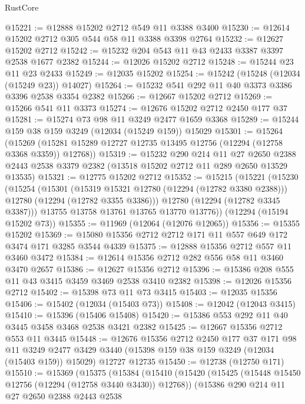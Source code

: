 \begin{lexlean}{RustCore}
\begin{coremodule}
@15221 := @12888 @15202 @2712 @549 @11 @3388 @3400
@15230 := @12614 @15202 @2712 @305 @544 @58 @11 @3388 @3398 @2764
@15232 := @12627 @15202 @2712
@15242 := @15232 @204 @543 @11 @43 @2433 @3387 @3397 @2538 @1677 @2382
@15244 := @12026 @15202 @2712
@15248 := @15244 @23 @11 @23 @2433
@15249 := @12035 @15202
@15254 := @15242 (@15248 (@12034 (@15249 @23)) @14027)
@15264 := @15232 @541 @292 @11 @40 @3373 @3386 @3396 @2538 @3354 @2382
@15266 := @12667 @15202 @2712
@15269 := @15266 @541 @11 @3373
@15274 := @12676 @15202 @2712 @2450 @177 @37
@15281 := @15274 @73 @98 @11 @3249 @2477 @1659 @3368
@15289 := @15244 @159 @38 @159 @3249 (@12034 (@15249 @159)) @15029
@15301 := @15264
    (@15269 (@15281 @15289 @12727 @12735 @13495 @12756 (@12294 (@12758 @3368 @3359)) @12768))
@15319 := @15232
    @290
    @214
    @11
    @27
    @2650
    @2388
    @2443
    @2538
    @3379
    @2382
    (@13518 @15202 @2712 @11 @289 @2650 @13529 @13535)
@15321 := @12775 @15202 @2712
@15352 := @15215
    (@15221
      (@15230
        (@15254
          (@15301
            (@15319 @15321 @12780 (@12294 (@12782 @3380 @2388)))
            @12780
            (@12294 (@12782 @3355 @3386)))
          @12780
          (@12294 (@12782 @3345 @3387)))
        @13755
        @13758
        @13761
        @13765
        @13770
        @13776))
    (@12294 (@15194 @15202 @73))
@15355 := @11969 (@12064 (@12076 @12065))
@15356 := @15355 @15202
@15369 := @15080 @15356 @2712 @2712 @171 @11 @557 @649 @172 @3474 @171 @3285 @3544 @4339
@15375 := @12888 @15356 @2712 @557 @11 @3460 @3472
@15384 := @12614 @15356 @2712 @282 @556 @58 @11 @3460 @3470 @2657
@15386 := @12627 @15356 @2712
@15396 := @15386 @208 @555 @11 @43 @3415 @3459 @3469 @2538 @3410 @2382
@15398 := @12026 @15356 @2712
@15402 := @15398 @73 @11 @73 @3415
@15403 := @12035 @15356
@15406 := @15402 (@12034 (@15403 @73))
@15408 := @12042 (@12043 @3415)
@15410 := @15396 (@15406 @15408)
@15420 := @15386 @553 @292 @11 @40 @3445 @3458 @3468 @2538 @3421 @2382
@15425 := @12667 @15356 @2712 @553 @11 @3445
@15448 := @12676
    @15356
    @2712
    @2450
    @177
    @37
    @171
    @98
    @11
    @3249
    @2477
    @3429
    @3440
    (@15398 @159 @38 @159 @3249 (@12034 (@15403 @159)) @15029)
    @12727
    @12735
@15450 := @12738 (@12750 @171)
@15510 := @15369
    (@15375
      (@15384
        (@15410
          (@15420
            (@15425 (@15448 @15450 @12756 (@12294 (@12758 @3440 @3430)) @12768))
            (@15386
              @290
              @214
              @11
              @27
              @2650
              @2388
              @2443
              @2538

\end{coremodule}
\end{lexlean}
